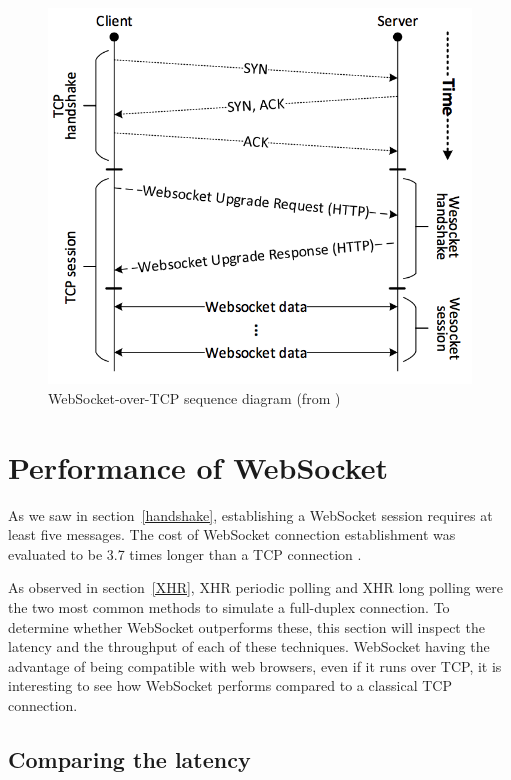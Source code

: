 \documentclass[10pt,journal,compsoc]{IEEEtran}
\newcommand{\ws}{WebSocket}
\begin{document}
\begin{figure}
    \centering
    \includegraphics[width=\linewidth]{websocket_tcp_diagram.png}
    \caption{\ws-over-TCP sequence diagram (from \cite{performanceEvaluationOfWebsocketProtocol})}
    \label{fig:websocket_connection}
\end{figure}


\section{Performance of \ws{}}

As we saw in section~\ref{handshake}, establishing a \ws{} session requires at least five messages.
The cost of \ws{} connection establishment was evaluated to be 3.7 times longer than a TCP connection \cite{performanceEvaluationOfWebsocketProtocol}.  %

As observed in section~\ref{XHR}, XHR periodic polling and XHR long polling were the two most common methods to simulate a full-duplex connection.
To determine whether \ws{} outperforms these, this section will inspect the latency and the throughput of each of these techniques.
\ws{} having the advantage of being compatible with web browsers, even if it runs over TCP, it is interesting to see how \ws{} performs compared to a classical TCP connection.

\subsection{Comparing the latency}
\end{document}
